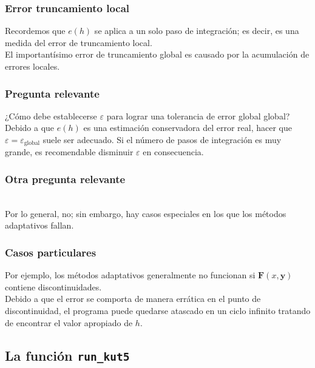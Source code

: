 \documentclass[12pt]{beamer}
\begin{document}
\begin{frame}
\frametitle{Error truncamiento local}
Recordemos que $e (h)$ se aplica a un solo paso de integración; es decir, es una medida del error de truncamiento local.
\\
\bigskip
\pause
El importantísimo error de truncamiento global es causado por la acumulación de errores locales.
\end{frame}
\begin{frame}
\frametitle{Pregunta relevante}
¿Cómo debe establecerse $\varepsilon$ para lograr una tolerancia de error global global?
\\
\bigskip
\pause
Debido a que $e (h)$ es una estimación conservadora del error real, \pause hacer que $\varepsilon = \varepsilon_{\text{global}}$ suele ser adecuado. \pause Si el número de pasos de integración es muy grande, es recomendable disminuir $\varepsilon$ en consecuencia.
\end{frame}
\begin{frame}
\frametitle{Otra pregunta relevante}
\textbf{}
\\
\bigskip
\pause
Por lo general, no; \pause sin embargo, hay casos especiales en los que los métodos adaptativos fallan.
\end{frame}
\begin{frame}
\frametitle{Casos particulares}
Por ejemplo, los métodos adaptativos generalmente no funcionan si $\mathbf{F} (x, \mathbf{y})$ contiene discontinuidades.
\\
\bigskip
\pause
Debido a que el error se comporta de manera errática en el punto de discontinuidad, el programa puede quedarse atascado en un ciclo infinito tratando de encontrar el valor apropiado de $h$. %
\end{frame}

\subsection{La función \texttt{run\_kut5}}
\end{document}
